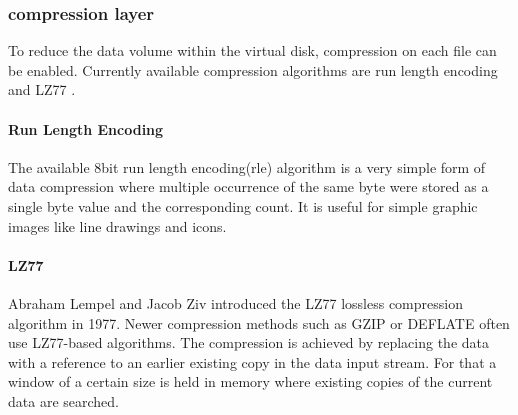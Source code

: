 \subsubsection{compression layer}

To reduce the data volume within the virtual disk, compression on each file can
be enabled. Currently available compression algorithms are run length encoding
\cite{rle} and LZ77 \cite{lz77}.

\paragraph{Run Length Encoding}

The available 8bit run length encoding(rle) algorithm is a very simple form of
data compression where multiple occurrence of the same byte were stored as a
single byte value and the corresponding count. It is useful for simple graphic
images like line drawings and icons.

\paragraph{LZ77}

Abraham Lempel and Jacob Ziv introduced the LZ77 lossless compression algorithm
in 1977. Newer compression methods such as GZIP or DEFLATE often use LZ77-based
algorithms. The compression is achieved by replacing the data with a reference
to an earlier existing copy in the data input stream. For that a window of
a certain size is held in memory where existing copies of the current data are
searched.

